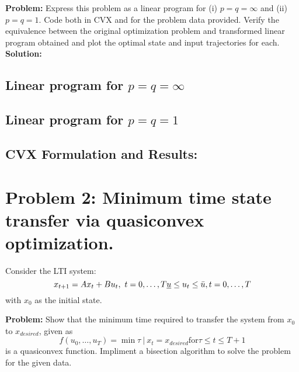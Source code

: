 \documentclass[letter]{article}
\begin{document}
\textbf{Problem:}
Express this problem as a linear program for (i) $p=q=\infty$ and (ii) $p=q=1$. Code both in CVX and for the problem data provided. Verify the equivalence between the original optimization problem and transformed linear program obtained and plot the optimal state and input trajectories for each.\\

\textbf{Solution:}
\subsection{Linear program for $p = q = \infty$}





\subsection{Linear program for $p = q = 1$}





\subsection{CVX Formulation and Results:}












\newpage
\section{Problem 2: Minimum time state transfer via quasiconvex optimization.}
Consider the LTI system:
\begin{equation}\label{eq:quasiconvex_opt_def}
	x_{t+1} = Ax_t + B u_t, \ t = 0,\dots,T\\
	\underline{u} \leq u_t \leq \bar{u}, t = 0,\dots,T
\end{equation}
with $x_0$ as the initial state.

\textbf{Problem:}
Show that the minimum time required to transfer the system from $x_0$ to $x_{desired}$, given as
\begin{equation}\label{eq:qualiconvex_problem_result}
	f(u_0,\dots,u_T) = \min{\tau \ | \ x_t = x_{desired} \text{for} \tau \leq t \leq {T+1}}
\end{equation}
is a quasiconvex function. Impliment a bisection algorithm to solve the problem for the given data.
\end{document}
